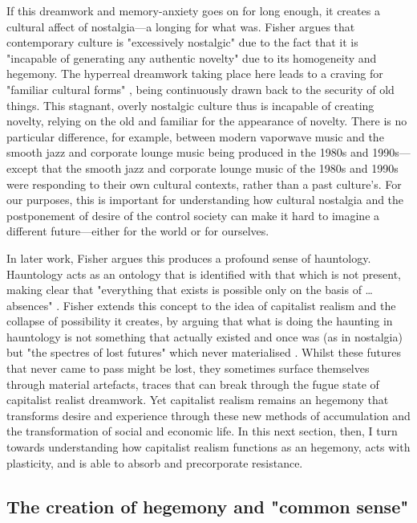If this dreamwork and memory-anxiety goes on for long enough, it creates a cultural affect of nostalgia—a longing for what was. Fisher argues that contemporary culture is "excessively nostalgic" due to the fact that it is "incapable of generating any authentic novelty" \citep[p. 63]{fisher_capitalist_2009} due to its homogeneity and hegemony. The hyperreal dreamwork taking place here leads to a craving for "familiar cultural forms" \citep[p. 63]{fisher_capitalist_2009}, being continuously drawn back to the security of old things. This stagnant, overly nostalgic culture thus is incapable of creating novelty, relying on the old and familiar for the appearance of novelty. There is no particular difference, for example, between modern vaporwave music and the smooth jazz and corporate lounge music being produced in the 1980s and 1990s—except that the smooth jazz and corporate lounge music of the 1980s and 1990s were responding to their own cultural contexts, rather than a past culture's. For our purposes, this is important for understanding how cultural nostalgia and the postponement of desire of the control society can make it hard to imagine a different future—either for the world or for ourselves.

In later work,  Fisher argues this produces a profound sense of hauntology. Hauntology acts as an ontology that is identified with that which is not present, making clear that "everything that exists is possible only on the basis of \ldots{} absences" \citep[p. 187]{fisher_ghosts_2014}. Fisher extends this concept to the idea of capitalist realism and the collapse of possibility it creates, by arguing that what is doing the haunting in hauntology is not something that actually existed and once was (as in nostalgia) but "the spectres of lost futures" which never materialised \citep[p. 21]{fisher_ghosts_2014}. Whilst these futures that never came to pass might be lost, they sometimes surface themselves through material artefacts, traces that can break through the fugue state of capitalist realist dreamwork. Yet capitalist realism remains an hegemony that transforms desire and experience through these new methods of accumulation and the transformation of social and economic life. In this next section, then, I turn towards understanding how capitalist realism functions as an hegemony, acts with plasticity, and is able to absorb and precorporate resistance.

\subsection{The creation of hegemony and "common sense"}
\label{subsec:the-creation-of-hegemony-and-common-sense}

